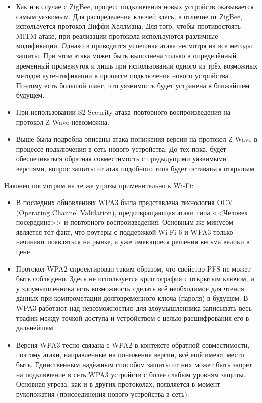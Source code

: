 	\begin{itemize}
		\item Как и в случае с ZigBee, процесс подключения новых устройств оказывается самым уязвимым.
		Для распределения ключей здесь, в отличие от ZigBee, используется протокол Диффи-Хеллмана. Для того,
		чтобы противостоять MITM-атаке, при реализации протокола используются различные модификации.
		Однако в \cite{formal-proof-of-z-wave-volnerability} приводится успешная атака несмотря на все методы 
		защиты. При этом атака может быть выполнена только в определённый временный промежуток и лишь
		при использовании одного из трёх возможных методов аутентификации в процессе подключения
		нового устройства. Поэтому есть большой шанс, что уязвимость будет устранена в ближайшем
		будущем.
		\item При использовании S2 Security атака повторного воспроизведения на протокол Z-Wave невозможна.
		\item Выше была подробна описаны атака понижения версии на протокол \newline Z-Wave в процессе подключения
		в сеть нового устройства. До тех пока, будет обеспечиваться обратная совместимость с предыдущими 
		уязвимыми версиями, вопрос защиты от атак подобного типа будет оставаться открытым.
	\end{itemize}

	Наконец посмотрим на те же угрозы применительно к Wi-Fi:
	
	\begin{itemize}
		\item В последних обновлениях WPA3 была представлена технология OCV (Operating Channel Validation),
		предотвращающая атаки типа <<Человек посередине>> и повторного воспроизведения. Основным же
		минусом является тот факт, что роутеры с поддержкой Wi-Fi 6 и WPA3 только начинают появляться
		на рынке, а уже имеющиеся решения весьма велики в цене.
		\item Протокол WPA2 спроектирован таким образом, что свойство PFS не может быть соблюдено.
		Здесь не используется криптография с открытым ключом, и у злоумышленника есть возможность
		сделать всё необходимое для чтения данных при компрометации долговременного ключа (пароля)
		в будущем. В WPA3 работают над невозможностью для злоумышленника записывать весь трафик
		между точкой доступа и устройством с целью расшифрования его в дальнейшем.
		\item Версия WPA3 тесно связана с WPA2 в контексте обратной совместимости, поэтому атаки,
		направленные на понижение версии, всё ещё имеют место быть. Единственным надёжным способом
		защиты от них может быть запрет на подключение в сеть WPA3 устройств с более слабым уровням
		защиты. Основная угроза, как и в других протоколах, появляется в момент рукопожатия (присоединения
		нового устройства в сеть).
	\end{itemize}

